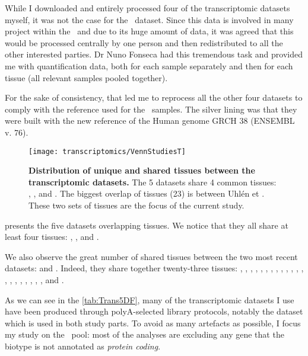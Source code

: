 While I downloaded and entirely processed four of the transcriptomic datasets
myself, it was not the case for the \Gtex\ dataset. Since this
data is involved in many project within the \EBI\ and due to its huge amount of
data, it was agreed that this would be processed centrally by one person and then
redistributed to all the other interested parties. Dr Nuno Fonseca had this
tremendous task and provided me with quantification data,
both for each sample separately and then for each tissue (all relevant samples
pooled together).

For the sake of consistency, that led me to reprocess all the other four datasets
to comply with the reference used for the \Gtex\ samples. The silver lining
was that they were built with the new reference of the
Human genome GRCH 38 (ENSEMBL v. 76).

\begin{figure}%
    \texttt{[image: transcriptomics/VennStudiesT]}\centering
    \caption[Distribution of unique and shared tissues between the
    transcriptomic datasets]
    {\label{fig:VennStudiesT}\textbf{Distribution of unique and shared tissues
    between the transcriptomic datasets.} The 5 datasets share 4
    common tissues: , ,  and
    . The biggest overlap of tissues (23) is between Uhlén et \Gtex.
    These two sets of tissues are the focus of the current study.}
\end{figure}

 presents the five datasets overlapping tissues. We notice
that they all share at least four tissues: , ,
 and .

We also observe the great number of shared tissues between the two most recent
datasets:  and . Indeed, they share together twenty-three
tissues: , , ,
, , ,
, , , ,
, , , ,
, , ,
, , , ,
 and .

As we can see in the \cref{tab:Trans5DF}, many of the transcriptomic datasets I
use have been produced through
polyA-selected library protocols, notably the  dataset which is
used in both study parts.
To avoid as many artefacts as possible, I
focus my study on the \mRNAs\ pool: most of the analyses are excluding
any gene that the biotype is not annotated as \emph{protein coding}.

